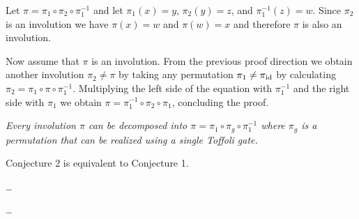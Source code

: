 \smallskip{}  Let $\pi = \pi_1\circ\pi_2\circ\pi_1^{-1}$ and
let $\pi_1(x)=y$, $\pi_2(y)=z$, and $\pi_1^{-1}(z)=w$.  Since $\pi_2$ is an
involution we have $\pi(x)=w$ and $\pi(w)=x$ and therefore $\pi$ is also an
involution.

Now assume that $\pi$ is an involution.  From the previous proof direction we
obtain another involution $\pi_2\neq \pi$ by taking any permutation $\pi_1\neq
\pi_{\rm id}$ by calculating $\pi_2=\pi_1\circ\pi\circ \pi_1^{-1}$.  Multiplying
the left side of the equation with $\pi_1^{-1}$ and the right side with $\pi_1$
we obtain $\pi=\pi_1^{-1}\circ\pi_2\circ\pi_1$, concluding the
proof. \qquad\slug

\smallskip{} \sl Every involution $\pi$ can be
decomposed into $\pi = \pi_1\circ \pi_g\circ \pi_1^{-1}$ where $\pi_g$ is a
permutation that can be realized using a single Toffoli gate. \rm

\smallskip\noindent Conjecture 2 is equivalent to Conjecture 1.

\medskip{}\enspace \dots

\medskip{}\enspace \dots

\bye
